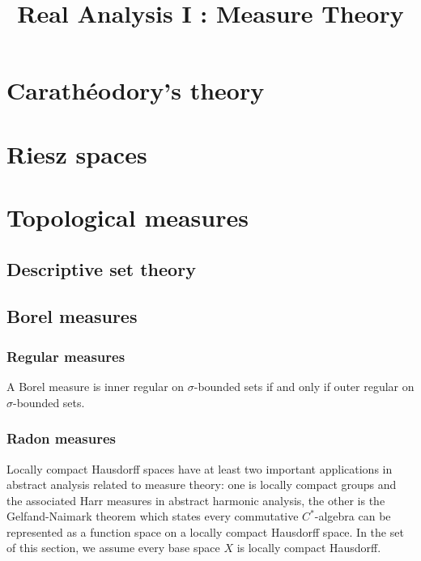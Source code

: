 \documentclass{../crs}
\title{Real Analysis I : Measure Theory}
\begin{document}
\maketitle
\tableofcontents

\chapter{Carath\'eodory's theory}


\chapter{Riesz spaces}



\chapter{Topological measures}

\section{Descriptive set theory}





\section{Borel measures}


\subsection{Regular measures}

\begin{thm}
A Borel measure is inner regular on $\sigma$-bounded sets if and only if outer regular on $\sigma$-bounded sets.
\end{thm}



\subsection{Radon measures}

Locally compact Hausdorff spaces have at least two important applications in abstract analysis related to measure theory: one is locally compact groups and the associated Harr measures in abstract harmonic analysis, the other is the Gelfand-Naimark theorem which states every commutative $C^*$-algebra can be represented as a function space on a locally compact Hausdorff space.
In the set of this section, we assume every base space $X$ is locally compact Hausdorff.
\end{document}
